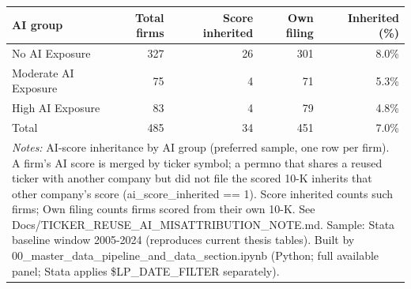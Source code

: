 \begin{tabular}{lrrrr}
\toprule
AI group & Total firms & Score inherited & Own filing & Inherited (\%) \\
\midrule
No AI Exposure & 327 & 26 & 301 & 8.0\% \\
Moderate AI Exposure & 75 & 4 & 71 & 5.3\% \\
High AI Exposure & 83 & 4 & 79 & 4.8\% \\
Total & 485 & 34 & 451 & 7.0\% \\
\bottomrule
\multicolumn{5}{p{0.95\linewidth}}{\footnotesize \textit{Notes:} AI-score inheritance by AI group (preferred sample, one row per firm). A firm's AI score is merged by ticker symbol; a permno that shares a reused ticker with another company but did not file the scored 10-K inherits that other company's score (ai\_score\_inherited == 1). Score inherited counts such firms; Own filing counts firms scored from their own 10-K. See Docs/TICKER\_REUSE\_AI\_MISATTRIBUTION\_NOTE.md. Sample: Stata baseline window 2005-2024 (reproduces current thesis tables). Built by 00\_master\_data\_pipeline\_and\_data\_section.ipynb (Python; full available panel; Stata applies \$LP\_DATE\_FILTER separately).} \\
\end{tabular}
